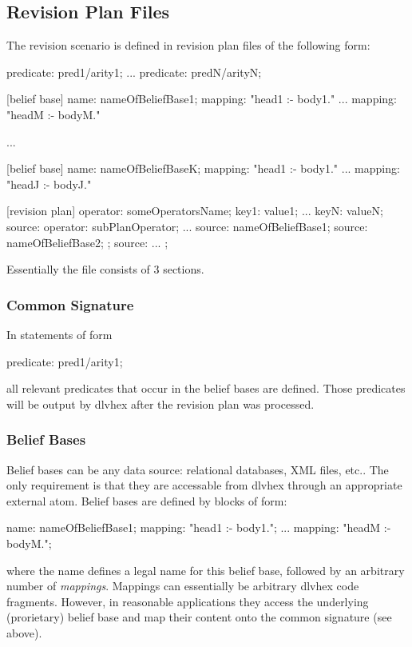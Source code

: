 \documentclass[a4paper,11pt]{article}
\theoremstyle{definition}
\newcommand{\dlvhex}{\textsf{dlvhex}\xspace }
\newcommand{\inlinecode}[1]{\textsf{#1}\xspace }
\begin{document}
		\subsection{Revision Plan Files}
		\label{sec:RPCompiler:Files}
		
			The revision scenario is defined in revision plan files of the following form:
			
			\begin{exampleprogram}
predicate: pred1/arity1;
...
predicate: predN/arityN;

[belief base]
name: nameOfBeliefBase1;
mapping: "head1 :- body1."
...
mapping: "headM :- bodyM."

...

[belief base]
name: nameOfBeliefBaseK;
mapping: "head1 :- body1."
...
mapping: "headJ :- bodyJ."

[revision plan]
{
	operator: someOperatorsName;
	key1: value1;
	...
	keyN: valueN;
	source: {
		operator: subPlanOperator;
		...
		source: {nameOfBeliefBase1};
		source: {nameOfBeliefBase2};
	};
	source: {
		...
	};
}
			\end{exampleprogram}

			Essentially the file consists of 3 sections.
			
			\subsubsection{Common Signature}
			
				In statements of form
				\begin{center}
					\inlinecode{predicate: pred1/arity1;}
				\end{center}
				all relevant predicates that occur in the belief bases are defined. Those predicates will be output by \dlvhex after the revision plan was processed.

			\subsubsection{Belief Bases}
			
				Belief bases can be any data source: relational databases, XML files, etc.. The only requirement is that they are accessable from \dlvhex through an
				appropriate external atom. Belief bases are defined by blocks of form:
				\begin{exampleprogram}
name: nameOfBeliefBase1;
mapping: "head1 :- body1.";
...
mapping: "headM :- bodyM.";
				\end{exampleprogram}
				where the \inlinecode{name} defines a legal name for this belief base, followed by an arbitrary number of \emph{mappings}. Mappings can essentially be arbitrary \dlvhex
				code fragments. However, in reasonable applications they access the underlying (prorietary) belief base and map their content onto the common signature (see above).
				
\end{document}
